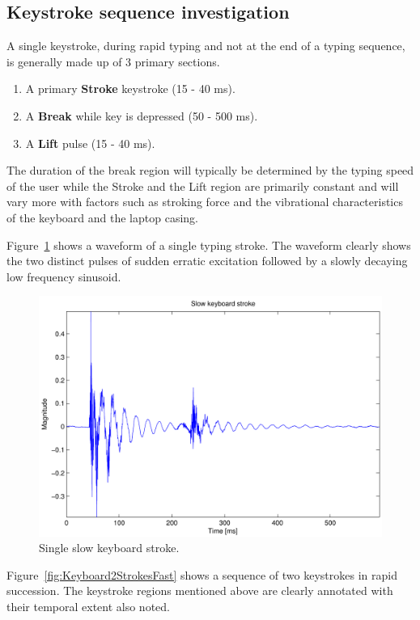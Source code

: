 \subsection{Keystroke sequence investigation}
A single keystroke, during rapid typing and not at the end of a typing sequence, is generally made up of 3 primary sections.
\begin{enumerate}
  \item A primary \textbf{Stroke} keystroke (15 - 40 ms).
  \item A \textbf{Break} while key is depressed (50 - 500 ms).
  \item A \textbf{Lift} pulse (15 - 40 ms).
\end{enumerate}
The duration of the break region will typically be determined by the typing speed of the user while the Stroke and the Lift region are primarily constant and will vary more with factors such as stroking force and the vibrational characteristics of the keyboard and the laptop casing.

Figure~\ref{fig:KeyboardStrokeSlow} shows a waveform of a single typing stroke. The waveform clearly shows the two distinct pulses of sudden erratic excitation followed by a slowly decaying low frequency sinusoid.

\begin{figure}[!] %
\centering
\includegraphics[width=120mm]{KeyboardStrokeSlow.pdf}
\caption{Single slow keyboard stroke.}\label{fig:KeyboardStrokeSlow}
\end{figure}

Figure~\ref{fig:Keyboard2StrokesFast} shows a sequence of two keystrokes in rapid succession. The keystroke regions mentioned above are clearly annotated with their temporal extent also noted.

